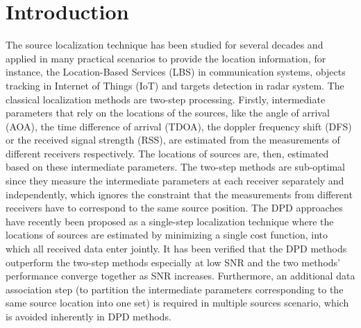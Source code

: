 \documentclass[review]{elsarticle}
\begin{document}
\linenumbers
\section{Introduction}
The source localization technique has been studied for several decades and applied in many practical scenarios to provide the location information, for instance, the Location-Based Services (LBS) in communication systems, objects tracking in Internet of Things (IoT) and targets detection in radar system. 
The classical localization methods are two-step processing. Firstly, intermediate parameters that rely on the locations of the sources, like the angle of arrival (AOA), the time difference of arrival (TDOA), the doppler frequency shift (DFS) or the received signal strength (RSS), are estimated from the measurements of different receivers respectively. The locations of sources are, then, estimated based on these intermediate parameters. The two-step methods are sub-optimal since they measure the intermediate parameters at each receiver separately and independently, which ignores the constraint that the measurements from different receivers have to correspond to the same source position. 
The DPD approaches have recently been proposed as a single-step localization technique where the locations of sources are estimated by minimizing a single cost function, into which all received data enter jointly. It has been verified that the DPD methods outperform the two-step methods especially at low SNR and the two methods' performance converge together as SNR increases. Furthermore, an additional data association step (to partition the intermediate parameters corresponding to the same source location into one set) is required in multiple sources scenario, which is avoided inherently in DPD methods. 
\end{document}

